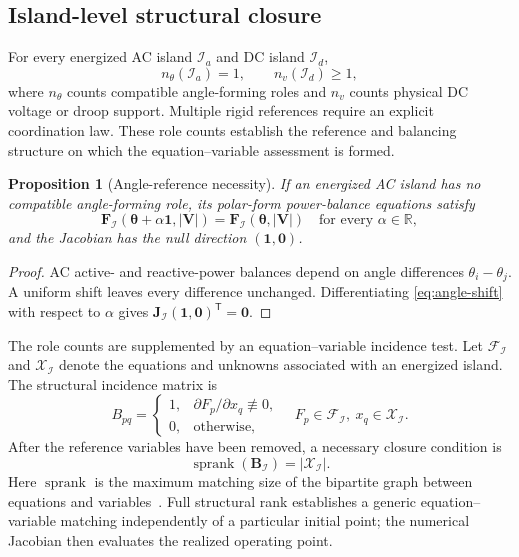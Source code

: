 \documentclass[final,5p,times,twocolumn]{elsarticle}
\newtheorem{proposition}{Proposition}
\begin{document}
\subsection{Island-level structural closure}

For every energized AC island $\mathcal I_a$ and DC island $\mathcal I_d$,
\begin{equation}
n_{\theta}(\mathcal I_a)=1,\qquad n_v(\mathcal I_d)\ge1,
\label{eq:rolecondition}
\end{equation}
where $n_{\theta}$ counts compatible angle-forming roles and $n_v$ counts
physical DC voltage or droop support. Multiple rigid references require an
explicit coordination law. These role counts establish the reference and
balancing structure on which the equation--variable assessment is formed.

\begin{proposition}[Angle-reference necessity]
\label{prop:angle-reference}
If an energized AC island has no compatible angle-forming role, its polar-form
power-balance equations satisfy
\begin{equation}
 \bm F_{\mathcal I}(\bm\theta+\alpha\bm 1,\bm{|V|})
 =\bm F_{\mathcal I}(\bm\theta,\bm{|V|})
 \quad\text{for every }\alpha\in\mathbb R,
 \label{eq:angle-shift}
\end{equation}
and the Jacobian has the null direction $(\bm1,\bm0)$.
\end{proposition}
\begin{proof}
AC active- and reactive-power balances depend on angle differences
$\theta_i-\theta_j$. A uniform shift leaves every difference unchanged.
Differentiating \eqref{eq:angle-shift} with respect to $\alpha$ gives
$\bm J_{\mathcal I}(\bm1,\bm0)^{\mathsf T}=\bm0$.
\end{proof}

The role counts are supplemented by an equation--variable incidence test. Let
$\mathcal F_{\mathcal I}$ and $\mathcal X_{\mathcal I}$ denote the equations and
unknowns associated with an energized island. The structural incidence matrix
is
\begin{equation}
 B_{pq}=\begin{cases}
 1,&\partial F_p/\partial x_q\not\equiv0,\\
 0,&\text{otherwise},
 \end{cases}
 \quad F_p\in\mathcal F_{\mathcal I},\ x_q\in\mathcal X_{\mathcal I}.
 \label{eq:structural-incidence}
\end{equation}
After the reference variables have been removed, a necessary closure condition
is
\begin{equation}
 \operatorname{sprank}(\bm{B}_{\mathcal I})
 =|\mathcal X_{\mathcal I}|.
 \label{eq:structural-rank}
\end{equation}
Here $\operatorname{sprank}$ is the maximum matching size of the bipartite graph
between equations and variables~\cite{murota1987systems}. Full structural rank
establishes a generic equation--variable matching independently of a particular
initial point; the numerical Jacobian then evaluates the realized operating
point.
\end{document}
